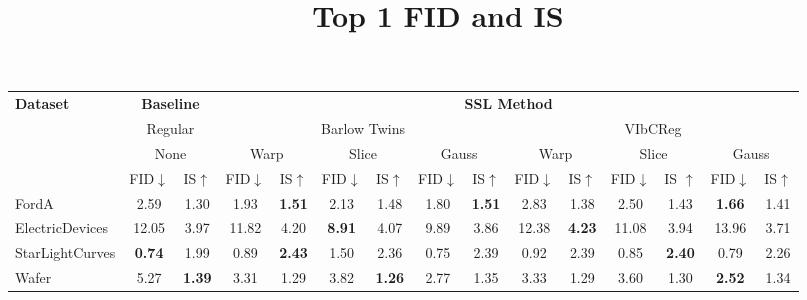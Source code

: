 \documentclass[../../thesis.tex]{subfiles}
\begin{document}
\begin{table}[H]
    \title{Top 1 FID and IS}
    \centering
    \begin{adjustbox}{width=\textwidth}
     \begin{tabular}{lcc|cc|cc|cc|cc|cc|cc} %
        \toprule
        \multirow{4}{*}{\textbf{Dataset}} & \multicolumn{2}{c}{\textbf{Baseline}} & \multicolumn{12}{c}{\textbf{SSL Method}} \\
                                            \cmidrule(lr){2-3} \cmidrule(lr){4-15}
                                          & \multicolumn{2}{c}{Regular}           & \multicolumn{6}{c}{Barlow Twins}                                                 &  \multicolumn{6}{c}{VIbCReg} \\
                                          \cmidrule(lr){2-3} \cmidrule(lr){4-9} \cmidrule(lr){10-15}
                                          &   \multicolumn{2}{c}{None}            & \multicolumn{2}{c}{Warp}  & \multicolumn{2}{c}{Slice} & \multicolumn{2}{c}{Gauss} & \multicolumn{2}{c}{Warp} & \multicolumn{2}{c}{Slice} & \multicolumn{2}{c}{Gauss} \\
                                          \cmidrule(lr){2-3} \cmidrule(lr){4-5} \cmidrule(lr){6-7} \cmidrule(lr){8-9} \cmidrule(lr){10-11} \cmidrule(lr){12-13}\cmidrule(lr){14-15}
                                          & FID$\downarrow$ & IS$\uparrow $                             & FID$\downarrow$ & IS$\uparrow$                  & FID$\downarrow$ & IS$\uparrow$                & FID$\downarrow$ & IS$\uparrow$                 & FID$\downarrow$ & IS$\uparrow$                 & FID$\downarrow$ & IS $\uparrow$                 & FID$\downarrow$ & IS$\uparrow$   \\
        \midrule
        FordA                   & 2.59 & 1.30 & 1.93 & \textbf{1.51} & 2.13 & 1.48 & 1.80 & \textbf{1.51} & 2.83 & 1.38 & 2.50 & 1.43 & \textbf{1.66} & 1.41 \\
        ElectricDevices         & 12.05 & 3.97 & 11.82 & 4.20 & \textbf{8.91} & 4.07 & 9.89 & 3.86 & 12.38 & \textbf{4.23} & 11.08 & 3.94 & 13.96 & 3.71 \\
        StarLightCurves         & \textbf{0.74} & 1.99 & 0.89 & \textbf{2.43} & 1.50 & 2.36 & 0.75 & 2.39 & 0.92 & 2.39 & 0.85 & \textbf{2.40} & 0.79 & 2.26 \\
        Wafer                   & 5.27 & \textbf{1.39} & 3.31 & 1.29 & 3.82 & \textbf{1.26} & 2.77 & 1.35 & 3.33 & 1.29 & 3.60 & 1.30 & \textbf{2.52} & 1.34 \\

\end{tabular}
\end{adjustbox}
\end{table}
\end{document}
